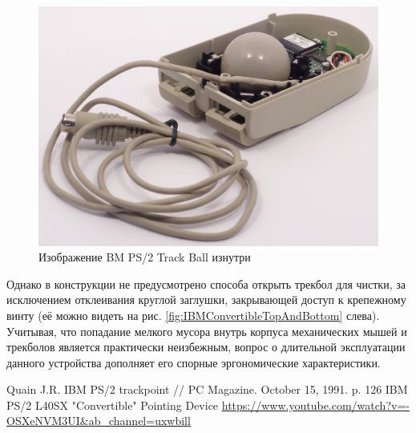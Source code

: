 \documentclass[11pt, a4paper]{article}
\begin{document}
\begin{figure}[h]
    \centering
    \includegraphics[scale=0.5]{1992_ibm_convertible/202.JPG}
    \caption{Изображение BM PS/2 Track Ball изнутри}
    \label{fig:IBMConvertibleInside}
\end{figure}

Однако в конструкции не предусмотрено способа открыть трекбол для чистки, за исключением отклеивания круглой заглушки, закрывающей доступ к крепежному винту (её можно видеть на рис. \ref{fig:IBMConvertibleTopAndBottom} слева). Учитывая, что попадание мелкого мусора внутрь корпуса механических мышей и трекболов является практически неизбежным, вопрос о длительной эксплуатации данного устройства дополняет его спорные эргономические характеристики.

\begin{thebibliography}{9}
 Quain J.R. IBM PS/2 trackpoint // PC Magazine. October 15, 1991. p. 126
 IBM PS/2 L40SX "Convertible" Pointing Device \url{https://www.youtube.com/watch?v=-OSXeNVM3UI&ab_channel=uxwbill}
\end{thebibliography}
\end{document}
